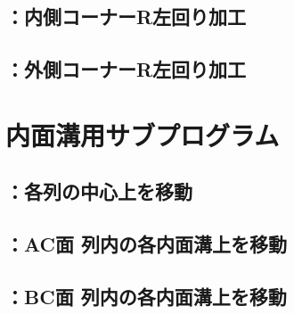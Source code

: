 \subsection{\KICRLeft：内側コーナーR左回り加工}



\clearpage
\subsection{\KOCRLeft：外側コーナーR左回り加工}




\clearpage
\section{内面溝用サブプログラム}


\subsection{\DLone：各列の中心上を移動}



\clearpage
\subsection{\DLtwoAC：AC面 列内の各内面溝上を移動}



\clearpage
\subsection{\DLtwoBD：BC面 列内の各内面溝上を移動}



